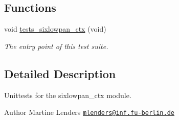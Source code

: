 \subsection*{Functions}
\begin{DoxyCompactItemize}
\item 
void \hyperlink{group__unittests_gaf9311b39cb1410823a35205c822900d9}{tests\+\_\+sixlowpan\+\_\+ctx} (void)
\begin{DoxyCompactList}\small\item\em The entry point of this test suite. \end{DoxyCompactList}\end{DoxyCompactItemize}


\subsection{Detailed Description}
Unittests for the {\ttfamily sixlowpan\+\_\+ctx} module. 

\begin{DoxyAuthor}{Author}
Martine Lenders \href{mailto:mlenders@inf.fu-berlin.de}{\tt mlenders@inf.\+fu-\/berlin.\+de} 
\end{DoxyAuthor}

